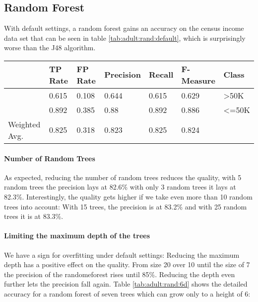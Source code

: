 \documentclass[paper=a4, fontsize=11pt]{scrartcl} %
\numberwithin{equation}{section} %
\numberwithin{figure}{section} %
\numberwithin{table}{section} %
\begin{document}
\subsection{Random Forest}

With default settings, a random forest gains an accuracy on the census income data set that can be seen in table \ref{tab:adult:rand:default}, which is surprisingly worse than the J48 algorithm.
\begin{table*}[htb]\centering
  \begin{tabular*}{\columnwidth}{@{}lllllll@{}}
      \toprule 
              &  TP Rate & FP Rate & Precision & Recall & F-Measure & Class    \\  \midrule
              &  0.615   & 0.108   & 0.644     & 0.615  & 0.629     & >50K     \\     
              &  0.892   & 0.385   & 0.88      & 0.892  & 0.886     & <=50K    \\ 
Weighted Avg. &  0.825   & 0.318   & 0.823     & 0.825  & 0.824     &          \\ \bottomrule
    \end{tabular*}
\caption{Random Forest -- Default Settings} 
\label{tab:adult:rand:default}
\end{table*}
\FloatBarrier


\paragraph{Number of Random Trees}
As expected, reducing the number of random trees reduces the quality, with 5 random trees the precision lays at 82.6\% with only 3 random trees it lays at 82.3\%. Interestingly, the quality gets higher if we take even more than 10 random trees into account: With 15 trees, the precision is at 83.2\% and with 25 random trees it is at 83.3\%.

\paragraph{Limiting the maximum depth of the trees}
We have a sign for overfitting under default settings: Reducing the maximum depth has a positive effect on the quality. From size 20 over 10 until the size of 7 the precision of the randomeforest rises until 85\%. Reducing the depth even further lets the precision fall again. Table \ref{tab:adult:rand:6d} shows the detailed accuracy for a random forest of seven trees which can grow only to a height of 6:
\end{document}
